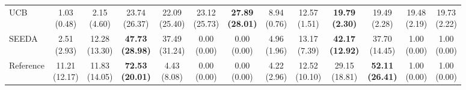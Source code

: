 {\begin{tabular}{l|cccccc|cccccc}
UCB & \makecell{1.03 \\ (0.48)} & \makecell{2.15 \\ (4.60)} & {\cellcolor[HTML]{C8E6C9}} \makecell{23.74 \\ (26.37)} & \makecell{22.09 \\ (25.40)} & \makecell{23.12 \\ (25.73)} & \bfseries \makecell{27.89 \\ (28.01)} & \makecell{8.94 \\ (0.76)} & \makecell{12.57 \\ (1.51)} & {\cellcolor[HTML]{C8E6C9}} \bfseries \makecell{19.79 \\ (2.30)} & \makecell{19.49 \\ (2.28)} & \makecell{19.48 \\ (2.19)} & \makecell{19.73 \\ (2.22)} \\
SEEDA & \makecell{2.51 \\ (2.93)} & \makecell{12.28 \\ (13.30)} & {\cellcolor[HTML]{C8E6C9}} \bfseries \makecell{47.73 \\ (28.98)} & \makecell{37.49 \\ (31.24)} & \makecell{0.00 \\ (0.00)} & \makecell{0.00 \\ (0.00)} & \makecell{4.96 \\ (1.96)} & \makecell{13.17 \\ (7.39)} & {\cellcolor[HTML]{C8E6C9}} \bfseries \makecell{42.17 \\ (12.92)} & \makecell{37.70 \\ (14.45)} & \makecell{1.00 \\ (0.00)} & \makecell{1.00 \\ (0.00)} \\
Reference & \makecell{11.21 \\ (12.17)} & \makecell{11.83 \\ (14.05)} & {\cellcolor[HTML]{C8E6C9}} \bfseries \makecell{72.53 \\ (20.01)} & \makecell{4.43 \\ (8.08)} & \makecell{0.00 \\ (0.00)} & \makecell{0.00 \\ (0.00)} & \makecell{4.22 \\ (2.96)} & \makecell{12.52 \\ (10.10)} & {\cellcolor[HTML]{C8E6C9}} \makecell{29.15 \\ (18.81)} & \bfseries \makecell{52.11 \\ (26.41)} & \makecell{1.00 \\ (0.00)} & \makecell{1.00 \\ (0.00)} \\

\end{tabular}}
